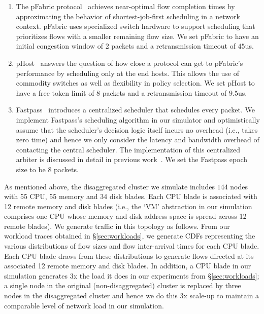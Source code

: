 \begin{enumerate}
\item {} The pFabric protocol~\cite{pfabric} achieves near-optimal flow completion times by approximating the behavior of shortest-job-first scheduling in a network context. pFabric uses specialized switch hardware to support scheduling that prioritizes flows with a smaller remaining flow size. We set pFabric to have an initial congestion window of 2 packets and a retransmission timeout of $45$us.
%
\item {} pHost~\cite{phost} answers the question of how close a protocol can get to pFabric's performance by scheduling only at the end hosts. This allows the use of commodity switches as well as flexibility in policy selection. We set pHost to have a free token limit of 8 packets and a retransmission timeout of $9.5$us.
%
\item {} Fastpass~\cite{fastpass} introduces a centralized scheduler that schedules  every packet. We implement Fastpass's scheduling algorithm in our simulator and optimistically assume that the scheduler's decision logic itself incurs no overhead (i.e., takes zero time) and hence we only consider the latency and bandwidth overhead of contacting the central scheduler. The implementation of this centralized arbiter is discussed in detail in previous work~\cite{phost}. We set the Fastpass epoch size to be 8 packets.%
%
\end{enumerate}


As mentioned above, the disaggregated cluster we simulate includes $144$ nodes 
with 55 CPU, 55 memory and 34 disk blades. 
Each CPU blade is associated with 12 remote memory and disk blades (i.e., the `VM' abstraction in our simulation comprises one CPU whose memory and disk address space 
is spread across 12 remote blades). 
We generate traffic in this topology as follows. From our workload traces obtained in \S\ref{sec:workloads}, we generate CDFs representing the various distributions of flow 
sizes and flow inter-arrival times for each CPU blade. Each CPU blade draws from these distributions to generate flows directed at its associated 12 remote memory and disk blades. In addition, a CPU blade in our simulation generates 3x the load it does 
in our experiments from \S\ref{sec:workloads}; a single node in the original (non-disaggregated) cluster is replaced by three nodes in the disaggregated cluster and hence we do this 3x scale-up to maintain a comparable level of network load in our 
simulation. 

